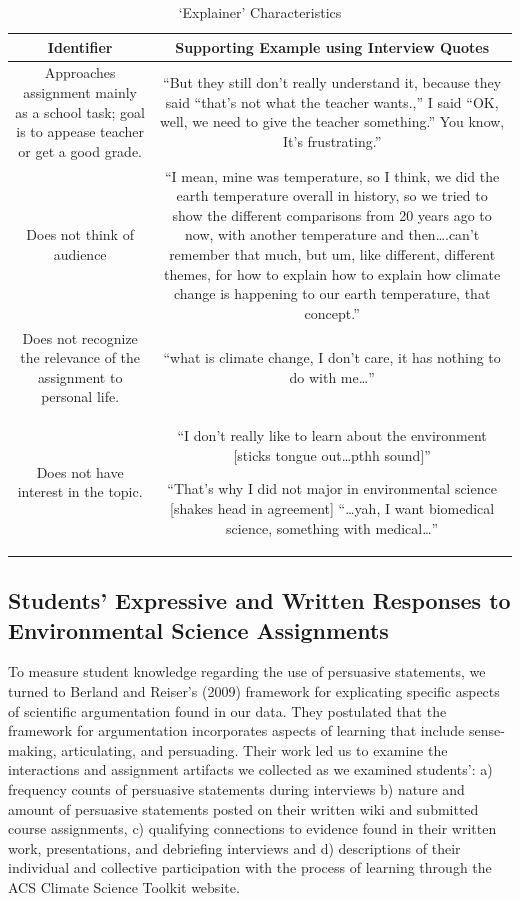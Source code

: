 \documentclass[11.5pt]{sig-alternate} %
\begin{document}
\begin{large}
\begin{table}[ht]
\caption{`Explainer' Characteristics}
\begin{tabular}{|c|c|}
\hline
Identifier & Supporting Example using Interview Quotes \\ \hline
Approaches assignment mainly as a school task; goal is to appease teacher or get a good grade. & “But they still don’t really understand it, because they said “that’s not what the teacher wants.,” I said “OK, well, we need to give the teacher something.” You know, It’s frustrating.” \\ \hline
Does not think of audience & “I mean, mine was temperature, so I think, we did the earth temperature overall in history, so we tried to show the different comparisons from 20 years ago to now, with another temperature and then….can’t remember that much, but um, like different, different themes, for how to explain how to explain how climate change is happening to our earth temperature, that concept.” \\ \hline
Does not recognize the relevance of the assignment to personal life. & “what is climate change, I don’t care, it has nothing to do with me…” \\ \hline
Does not have interest in the topic. & “I don’t really like to learn about the environment [sticks tongue out…pthh sound]” 

“That’s why I did not major in environmental science [shakes head in agreement] “…yah, I want biomedical science, something with medical…” \\ \hline
\end{tabular}
\end{table}

\subsection*{Students’ Expressive and Written Responses to Environmental Science Assignments}
To measure student knowledge regarding the use of persuasive statements, we turned to Berland and Reiser’s (2009) framework for explicating specific aspects of scientific argumentation found in our data. They postulated that the framework for argumentation incorporates aspects of learning that include sense-making, articulating, and persuading. Their work led us to examine the interactions and assignment artifacts we collected as we examined students’: a) frequency counts of persuasive statements during interviews b) nature and amount of persuasive statements posted on their written wiki and submitted course assignments, c) qualifying connections to evidence found in their written work, presentations, and debriefing interviews and d) descriptions of their individual and collective participation with the process of learning through the ACS Climate Science Toolkit website. 


\end{large}
\end{document}
